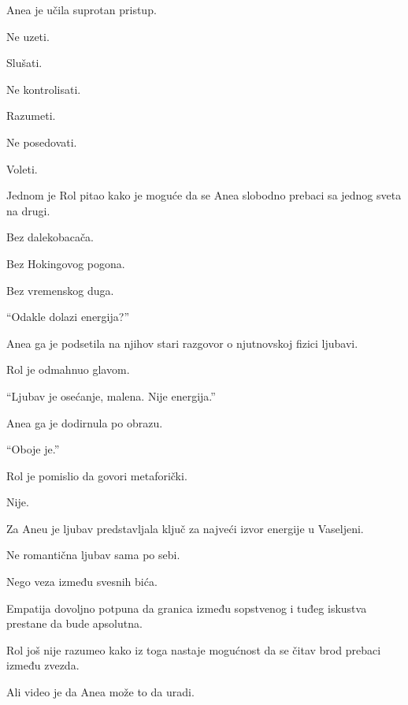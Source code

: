 Anea je učila suprotan pristup.

\bigskip

Ne uzeti.

Slušati.

\bigskip

Ne kontrolisati.

Razumeti.

\bigskip

Ne posedovati.

Voleti.

\bigskip

Jednom je Rol pitao kako je moguće da se Anea slobodno prebaci sa jednog sveta na drugi.

Bez dalekobacača.

Bez Hokingovog pogona.

Bez vremenskog duga.

\bigskip

``Odakle dolazi energija?''

\bigskip

Anea ga je podsetila na njihov stari razgovor o njutnovskoj fizici ljubavi.

\bigskip

Rol je odmahnuo glavom.

``Ljubav je osećanje, malena. Nije energija.''

\bigskip

Anea ga je dodirnula po obrazu.

``Oboje je.''

\bigskip

Rol je pomislio da govori metaforički.

Nije.

\bigskip

Za Aneu je ljubav predstavljala ključ za najveći izvor energije u Vaseljeni.

Ne romantična ljubav sama po sebi.

\bigskip

Nego veza između svesnih bića.

Empatija dovoljno potpuna da granica između sopstvenog i tuđeg iskustva prestane da bude apsolutna.

\bigskip

Rol još nije razumeo kako iz toga nastaje mogućnost da se čitav brod prebaci između zvezda.

\bigskip

Ali video je da Anea može to da uradi.

\bigskip

